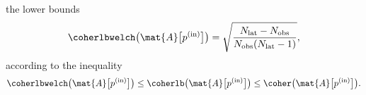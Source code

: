 the  lower bounds
\cite[Thm. 5.7]{book:Foucart2013}
\begin{equation}
  \coherlbwelch\bigl( \mat{A}\bigl[ p^{(\text{in})} \bigr] \bigr)
  =
  \sqrt{ \frac{ N_{\text{lat}} - N_{\text{obs}} }{ N_{\text{obs}} ( N_{\text{lat}} - 1 ) } },
 \label{eqn:disc_coherence_lb_welch}
\end{equation}
according to
the inequality
\begin{equation}
  \coherlbwelch\bigl( \mat{A}\bigl[ p^{(\text{in})} \bigr] \bigr)
  \leq
  \coherlb\bigl( \mat{A}\bigl[ p^{(\text{in})} \bigr] \bigr)
  \leq
  \coher\bigl( \mat{A}\bigl[ p^{(\text{in})} \bigr] \bigr).
 \label{eqn:disc_coherence_lb}
\end{equation}

